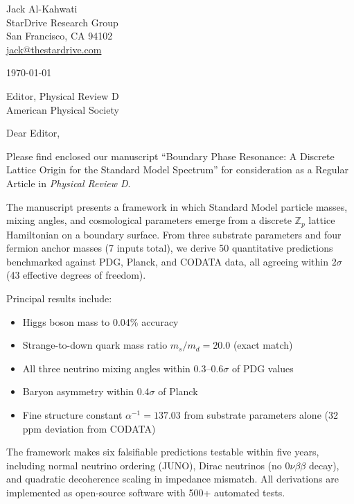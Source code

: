 \documentclass[11pt]{article}
\begin{document}
\begin{flushleft}
Jack Al-Kahwati\\
StarDrive Research Group\\
San Francisco, CA 94102\\
\href{mailto:jack@thestardrive.com}{jack@thestardrive.com}
\end{flushleft}

\vspace{1em}
\today

\vspace{1em}
Editor, Physical Review D\\
American Physical Society

\vspace{1em}
Dear Editor,

\vspace{0.5em}
Please find enclosed our manuscript ``Boundary Phase Resonance: A Discrete Lattice Origin for the Standard Model Spectrum'' for consideration as a Regular Article in \textit{Physical Review D}.

The manuscript presents a framework in which Standard Model particle masses, mixing angles, and cosmological parameters emerge from a discrete $\mathbb{Z}_p$ lattice Hamiltonian on a boundary surface. From three substrate parameters and four fermion anchor masses (7 inputs total), we derive 50 quantitative predictions benchmarked against PDG, Planck, and CODATA data, all agreeing within $2\sigma$ (43 effective degrees of freedom).

Principal results include:
\begin{itemize}
\item Higgs boson mass to 0.04\% accuracy
\item Strange-to-down quark mass ratio $m_s/m_d = 20.0$ (exact match)
\item All three neutrino mixing angles within 0.3--0.6$\sigma$ of PDG values
\item Baryon asymmetry within 0.4$\sigma$ of Planck
\item Fine structure constant $\alpha^{-1} = 137.03$ from substrate parameters alone (32 ppm deviation from CODATA)
\end{itemize}

The framework makes six falsifiable predictions testable within five years, including normal neutrino ordering (JUNO), Dirac neutrinos (no $0\nu\beta\beta$ decay), and quadratic decoherence scaling in impedance mismatch. All derivations are implemented as open-source software with 500+ automated tests.
\end{document}
